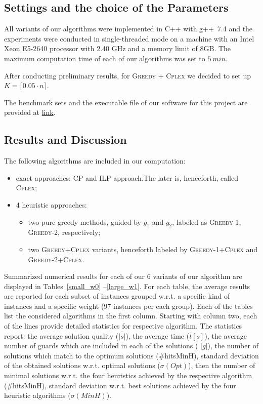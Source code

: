 \documentclass[runningheads,a4paper]{elsarticle}
\begin{document}
     \subsection{Settings and the choice of the Parameters}
      All variants of our algorithms were implemented in C++ with g++~7.4 and the experiments were conducted in single-threaded mode on a machine with an Intel Xeon E5-2640 processor with 2.40 GHz and a memory limit of 8GB. The maximum computation time of each of our algorithms was set to $5\ min$.

      After conducting preliminary results, for
        \textsc{Greedy + \textsc{Cplex}} we decided to set up $K = \lceil 0.05 \cdot n \rceil$.

     The benchmark sets and the executable file of our software for this project are provided at \href{link}{link}.
	\subsection{Results and Discussion}
        The following algorithms are included in our computation:
        \begin{itemize}
        	\item  exact approaches: CP and ILP approach.The later is, henceforth, called \textsc{Cplex};
            \item 4 heuristic approaches:
           \begin{itemize}
           	\item two pure greedy methods, guided by $g_1$ and $g_2$, labeled as \textsc{Greedy-1}, \textsc{Greedy-2}, respectively;
            \item two \textsc{Greedy+Cplex} variants, henceforth labeled by  \textsc{Greedy-1}+\textsc{Cplex} and 
            \textsc{Greedy-2}+\textsc{Cplex}. 
        \end{itemize}
    \end{itemize}
            
        
         Summarized numerical results for each of our 6 variants of our algorithm are displayed 
         in Tables~\ref{small_w0} --\ref{large_w1}. For each table, the average results are reported for each subset of instances grouped w.r.t. a specific kind of instances and a specific weight (97 instances per each group). Each of the tables list the considered algorithms in the first column. Starting with column two,  each of the lines provide detailed statistics for respective algorithm.  The statistics report: the average solution quality ($\bar{|s|}$), the average time ($\bar{t}[s]$), the average number of guards which are included in each of the solutions ( $\bar{|g|}$), the number of solutions which match to the optimum solutions (\#hitsMinH), standard deviation of the obtained solutions w.r.t. optimal solutions ($\sigma(Opt)$), then the number of minimal solutions w.r.t. the four heuristics achieved by the respective algorithm (\#hitsMinH), standard deviation w.r.t. best solutions achieved by the four heuristic algorithms   ($\sigma(MinH)$).       
         
\end{document}
